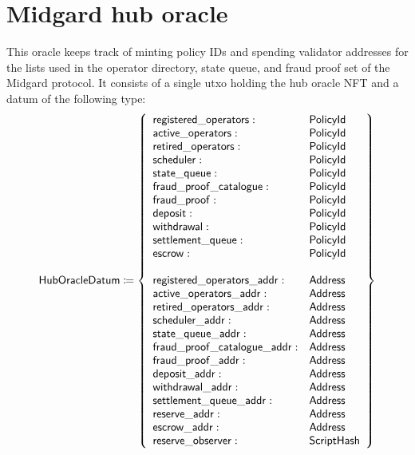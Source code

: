 \documentclass[../midgard.tex]{subfiles}
\begin{document}
\section{Midgard hub oracle}
\label{h:midgard-hub-oracle}

This oracle keeps track of minting policy IDs and spending validator addresses for the lists used in the operator directory, state queue, and fraud proof set of the Midgard protocol.
It consists of a single utxo holding the hub oracle NFT and a datum of the following type:
\begin{equation*}
    \mathsf{HubOracleDatum} \coloneq \left\{
    \begin{array}{ll}
        \mathsf{registered\_operators} : & \mathsf{PolicyId} \\
        \mathsf{active\_operators} : & \mathsf{PolicyId} \\
        \mathsf{retired\_operators} : & \mathsf{PolicyId} \\
        \mathsf{scheduler} : & \mathsf{PolicyId} \\
        \mathsf{state\_queue} : & \mathsf{PolicyId} \\
        \mathsf{fraud\_proof\_catalogue} : & \mathsf{PolicyId} \\
        \mathsf{fraud\_proof} : & \mathsf{PolicyId} \\
        \mathsf{deposit} : & \mathsf{PolicyId} \\
        \mathsf{withdrawal} : & \mathsf{PolicyId} \\
        \mathsf{settlement\_queue} : & \mathsf{PolicyId} \\
        \mathsf{escrow} : & \mathsf{PolicyId} \\
        \\
        \mathsf{registered\_operators\_addr} : & \mathsf{Address} \\
        \mathsf{active\_operators\_addr} : & \mathsf{Address} \\
        \mathsf{retired\_operators\_addr} : & \mathsf{Address} \\
        \mathsf{scheduler\_addr} : & \mathsf{Address} \\
        \mathsf{state\_queue\_addr} : & \mathsf{Address} \\
        \mathsf{fraud\_proof\_catalogue\_addr} : & \mathsf{Address} \\
        \mathsf{fraud\_proof\_addr} : & \mathsf{Address} \\
        \mathsf{deposit\_addr} : & \mathsf{Address} \\
        \mathsf{withdrawal\_addr} : & \mathsf{Address} \\
        \mathsf{settlement\_queue\_addr} : & \mathsf{Address} \\
        \mathsf{reserve\_addr} : & \mathsf{Address} \\ 
        \mathsf{escrow\_addr} : & \mathsf{Address} \\ 
        \mathsf{reserve\_observer} : & \mathsf{ScriptHash}
    \end{array} \right\}
\end{equation*}
\end{document}
